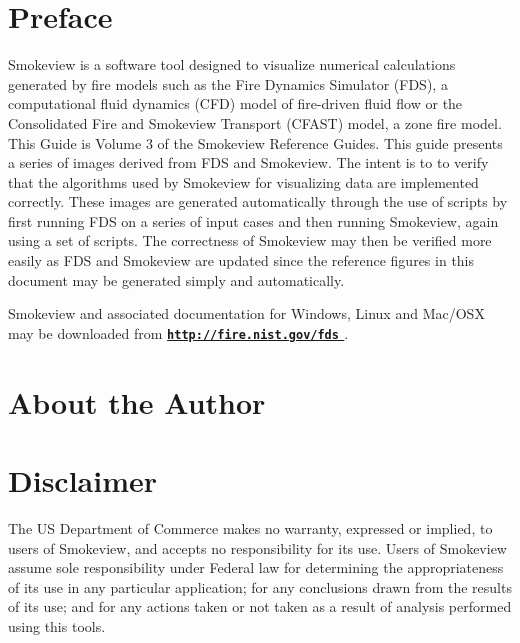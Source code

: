 \documentclass[11pt,twoside]{book}
\newcommand{\hhref}[1]{\href{#1}{{\tt #1}
}}
\begin{document}
\chapter{Preface}
Smokeview is a software tool designed to visualize numerical
calculations generated by fire models such as the Fire Dynamics Simulator (FDS),
a computational fluid dynamics (CFD) model of fire-driven fluid
flow or the Consolidated Fire and Smokeview Transport (CFAST) model, a zone fire model. This Guide is Volume 3 of the Smokeview Reference
Guides.
This guide presents a series of images derived from FDS and Smokeview.  The intent is to to verify that the algorithms used by Smokeview for visualizing data are implemented correctly.  These images are generated automatically through the use of scripts by first running FDS on a series of input cases and then running Smokeview, again using a set of scripts.  The correctness of Smokeview may then be verified more easily as FDS and Smokeview are updated since the reference figures in this document may be generated simply and automatically.

Smokeview and associated
documentation for Windows, Linux and Mac/OSX may be downloaded from  {\bf
\hhref{http://fire.nist.gov/fds}} .


\chapter{About the Author}
\begin{description}

\end{description}


\chapter{Disclaimer}

The US Department of Commerce makes no warranty,
expressed or implied, to users of Smokeview, and accepts no
responsibility for its use. Users of Smokeview assume sole
responsibility under Federal law for determining the
appropriateness of its use in any particular application; for any
conclusions drawn from the results of its use; and for any actions
taken or not taken as a result of analysis performed using this
tools.
\end{document}
